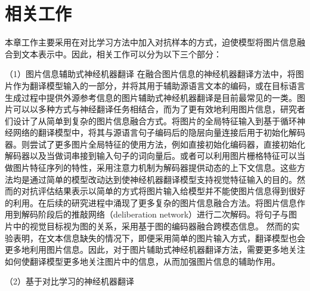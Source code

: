 \section{相关工作}
本章工作主要采用在对比学习方法中加入对抗样本的方式，迫使模型将图片信息融合到文本表示中。因此，相关工作可以分为以下三个部分：

{\sffamily （1）图片信息辅助式神经机器翻译}
在融合图片信息的神经机器翻译方法中，将图片作为翻译模型输入的一部分，并将其用于辅助源语言文本的编码，或在目标语言生成过程中提供外源参考信息的图片辅助式神经机器翻译是目前最常见的一类。图片可以以多种方式与神经翻译任务相结合，而为了更有效地利用图片信息，研究者们设计了从简单到复杂的图片信息融合方式。将图片的全局特征输入到基于循环神经网络的翻译模型中，将其与源语言句子编码后的隐层向量连接后用于初始化解码器。则尝试了更多图片全局特征的使用方法，例如直接初始化编码器，直接初始化解码器以及当做词串接到输入句子的词向量后。或者可以利用图片栅格特征可以当做图片特征序列的特性，采用注意力机制为解码器提供动态的上下文信息。这些方法均是通过简单的模型改动达到使神经机器翻译模型支持视觉特征输入的目的。然而的对抗评估结果表示以简单的方式将图片输入给模型并不能使图片信息得到很好的利用。在后续的研究进程中涌现了更多复杂的图片信息融合方法。将图片信息作用到解码阶段后的推敲网络（deliberation network）进行二次解码。将句子与图片中的视觉目标视为图的关系，采用基于图的编码器融合跨模态信息。
然而的实验表明，在文本信息缺失的情况下，即便采用简单的图片输入方式，翻译模型也会更多地利用图片信息。因此，对于图片辅助式神经机器翻译方法，需要更多地关注如何使翻译模型更多地关注图片中的信息，从而加强图片信息的辅助作用。

{\sffamily （2）基于对比学习的神经机器翻译}


